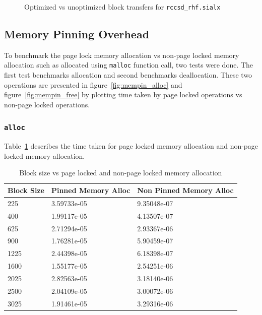 \begin{figure}[h]
  
  \caption{Optimized vs unoptimized block transfers for \texttt{rccsd\_rhf.sialx}}
  \label{fig:optimized_block_transfer}
\end{figure}

\subsection{Memory Pinning Overhead}
To benchmark the page lock memory allocation vs non-page locked memory allocation
such as allocated using \texttt{malloc} function call, two tests were done. The
first test benchmarks allocation and second benchmarks deallocation. These two
operations are presented in figure~\ref{fig:mempin_alloc} and figure~\ref{fig:mempin_free}
by plotting time taken by page locked operations vs non-page locked operations.

\subsubsection{\texttt{alloc}}
Table~\ref{tab:mempin_alloc} describes the time taken for page locked memory allocation
and non-page locked memory allocation.
\begin{table}[h]
  \centering
  \caption{Block size vs page locked and non-page locked memory allocation}
  \begin{tabular}{l l l}
    \hline
    Block Size & Pinned Memory Alloc & Non Pinned Memory Alloc \\
    \hline
    225        & 3.59733e-05         & 9.35048e-07             \\
    400        & 1.99117e-05         & 4.13507e-07             \\
    625        & 2.71294e-05         & 2.93367e-06             \\
    900        & 1.76281e-05         & 5.90459e-07             \\
    1225       & 2.44398e-05         & 6.18398e-07             \\
    1600       & 1.55177e-05         & 2.54251e-06             \\
    2025       & 2.82563e-05         & 3.18140e-06             \\
    2500       & 2.04109e-05         & 3.00072e-06             \\
    3025       & 1.91461e-05         & 3.29316e-06             \\
    \hline
  \end{tabular}
  \label{tab:mempin_alloc}
\end{table}

